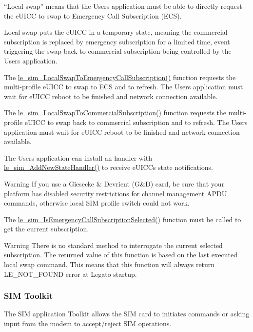 “\+Local swap” means that the User\textquotesingle{}s application must be able to directly request the e\+U\+I\+C\+C to swap to Emergency Call Subscription (E\+C\+S).

Local swap puts the e\+U\+I\+C\+C in a temporary state, meaning the commercial subscription is replaced by emergency subscription for a limited time, event triggering the swap back to commercial subscription being controlled by the User\textquotesingle{}s application.

The \hyperlink{le__sim__interface_8h_aa856f5e094e8182c8d0b07761e309549}{le\+\_\+sim\+\_\+\+Local\+Swap\+To\+Emergency\+Call\+Subscription()} function requests the multi-\/profile e\+U\+I\+C\+C to swap to E\+C\+S and to refresh. The User\textquotesingle{}s application must wait for e\+U\+I\+C\+C reboot to be finished and network connection available.

The \hyperlink{le__sim__interface_8h_a51b535750b66c4cf460e3c8c72f3658d}{le\+\_\+sim\+\_\+\+Local\+Swap\+To\+Commercial\+Subscription()} function requests the multi-\/profile e\+U\+I\+C\+C to swap back to commercial subscription and to refresh. The User\textquotesingle{}s application must wait for e\+U\+I\+C\+C reboot to be finished and network connection available.

The User\textquotesingle{}s application can install an handler with \hyperlink{le__sim__interface_8h_a8e296a7cd35edd99cb1dc21232e280dd}{le\+\_\+sim\+\_\+\+Add\+New\+State\+Handler()} to receive e\+U\+I\+C\+C\textquotesingle{}s state notifications.

\begin{DoxyWarning}{Warning}
If you use a Giesecke \& Devrient (G\&D) card, be sure that your platform has disabled security restrictions for channel management A\+P\+D\+U commands, otherwise local S\+I\+M profile switch could not work.
\end{DoxyWarning}
The \hyperlink{le__sim__interface_8h_a837cdc0fe30761f4339f846a0b44c5f1}{le\+\_\+sim\+\_\+\+Is\+Emergency\+Call\+Subscription\+Selected()} function must be called to get the current subscription.

\begin{DoxyWarning}{Warning}
There is no standard method to interrogate the current selected subscription. The returned value of this function is based on the last executed local swap command. This means that this function will always return L\+E\+\_\+\+N\+O\+T\+\_\+\+F\+O\+U\+N\+D error at Legato startup.
\end{DoxyWarning}
\hypertarget{c_sim_le_sim_stk}{}\subsubsection{S\+I\+M Toolkit}\label{c_sim_le_sim_stk}
The S\+I\+M application Toolkit allows the S\+I\+M card to initiates commands or asking input from the modem to accept/reject S\+I\+M operations.


